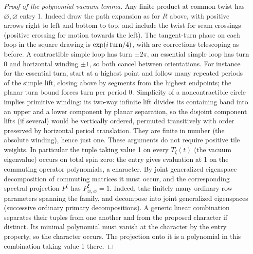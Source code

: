 \begin{proof}[Proof of the polynomial vacuum lemma]
Any finite product at common twist has \(\varnothing,\varnothing\) entry 1. Indeed draw the path expansion as for \(R\) above, with positive arrows right to left and bottom to top, and include the twist for seam crossings (positive crossing for motion towards the left). The tangent-turn phase on each loop in the square drawing is \(\exp(i\,{\rm turn}/4)\), with arc corrections telescoping as before. A contractible simple loop has turn \(\pm2\pi\), an essential simple loop has turn 0 and horizontal winding \(\pm1\), so both cancel between orientations. For instance for the essential turn, start at a highest point and follow many repeated periods of the simple lift, closing above by segments from the highest endpoints; the planar turn bound forces turn per period 0. Simplicity of a noncontractible circle implies primitive winding: its two-way infinite lift divides its containing band into an upper and a lower component by planar separation, so the disjoint component lifts (if several) would be vertically ordered, permuted transitively with order preserved by horizontal period translation. They are finite in number (the absolute winding), hence just one. These arguments do not require positive tile weights. In particular the tuple taking value 1 on every \(T_\xi(t)\) (the vacuum eigenvalue) occurs on total spin zero: the entry gives evaluation at 1 on the commuting operator polynomials, a character. By joint generalized eigenspace decomposition of commuting matrices it must occur, and the corresponding spectral projection \(P^\xi\) has \(P^\xi_{\varnothing,\varnothing}=1\). Indeed, take finitely many ordinary row parameters spanning the family, and decompose into joint generalized eigenspaces (successive ordinary primary decompositions). A generic linear combination separates their tuples from one another and from the proposed character if distinct. Its minimal polynomial must vanish at the character by the entry property, so the character occurs. The projection onto it is a polynomial in this combination taking value 1 there.


\end{proof}

